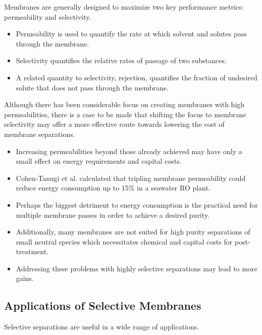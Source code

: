   Membranes are generally designed to maximize two key performance metrics: 
  permeability and selectivity.
  \begin{itemize}
    \item Permeability is used to quantify the rate at which solvent and solutes
    pass through the membrane.
    \item Selectivity quantifies the relative rates of passage of two substances.
    \item A related quantity to selectivity, rejection, quantifies the fraction
    of undesired solute that does not pass through the membrane.
  \end{itemize}
  
  Although there has been considerable focus on creating membranes with high
  permeabilities, there is a case to be made that shifting the focus to membrane
  selectivity may offer a more effective route towards lowering the cost of 
  membrane separations.~\cite{werber_materials_2016}
  \begin{itemize}
    \item Increasing permeabilities beyond those already achieved may have 
    only a small effect on energy requirements and capital costs. 
    \item Cohen-Tanugi et al. calculated that tripling membrane permeability
    could reduce energy consumption up to 15\% in a seawater RO plant.~\cite{cohen-tanugi_quantifying_2014}
    \item Perhaps the biggest detriment to energy consumption is the practical
	need for multiple membrane passes in order to achieve a desired purity.
    \item Additionally, many membranes are not suited for high purity separations
    of small neutral species which necessitates chemical and capital costs for
    post-treatment.
    \item Addressing these problems with highly selective separations may lead to 
    more gains.
 \end{itemize} 
  
  \subsection{Applications of Selective Membranes}
  
  
  Selective separations are useful in a wide range of applications.  
  
